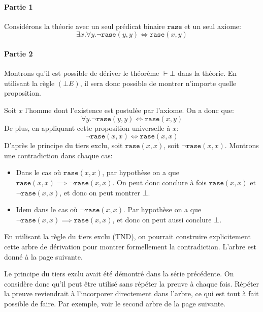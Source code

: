 \documentclass[12pt,french,a4paper]{article}
\begin{document}
\begin{question}
\paragraph{Partie 1}
Considérons la théorie avec un seul prédicat binaire $\texttt{rase}$ et un seul axiome:
\[
\exists x. \forall y. \neg \texttt{rase}(y, y) \iff \texttt{rase}(x, y)
\]

\paragraph{Partie 2}
Montrons qu'il est possible de dériver le théorème $\vdash \bot$ dans la théorie. En utilisant la règle $(\bot E)$, il sera donc possible de montrer n'importe quelle proposition.

Soit $x$ l'homme dont l'existence est postulée par l'axiome. On a donc que:
\[
\forall y. \neg \texttt{rase}(y, y) \iff \texttt{rase}(x, y)
\]
De plus, en appliquant cette proposition universelle à $x$:
\[
\neg \texttt{rase}(x, x) \iff \texttt{rase}(x, x)
\]
D'après le principe du tiers exclu, soit $\texttt{rase}(x, x)$, soit $\neg \texttt{rase}(x, x)$. Montrons une contradiction dans chaque cas:
\begin{itemize}
\item Dans le cas où $\texttt{rase}(x, x)$, par hypothèse on a que $\texttt{rase}(x, x) \implies \neg \texttt{rase}(x, x)$. On peut donc conclure à fois $\texttt{rase}(x, x)$ et $\neg \texttt{rase}(x, x)$, et donc on peut montrer $\bot$.
\item Idem dans le cas où $\neg \texttt{rase}(x, x)$. Par hypothèse on a que $\neg \texttt{rase}(x, x) \implies \texttt{rase}(x, x)$, et donc on peut aussi conclure $\bot$.
\end{itemize}

En utilisant la règle du tiers exclu (TND), on pourrait construire explicitement cette arbre de dérivation pour montrer formellement la contradiction. L'arbre est donné à la page suivante.

Le principe du tiers exclu avait été démontré dans la série précédente.
On considère donc qu'il peut être utilisé sans répéter la preuve à chaque fois.
Répéter la preuve reviendrait à l'incorporer directement dans l'arbre, ce qui est tout à fait possible de faire.
Par exemple, voir le second arbre de la page suivante.
\newpage


\end{question}
\end{document}

